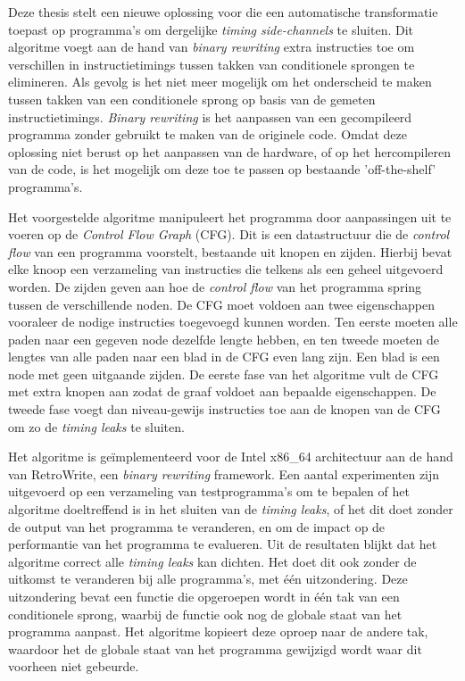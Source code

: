 \documentclass[master=cws,masteroption=ai, english]{kulemt}
\begin{document}
\begin{abstract*}
Deze thesis stelt een nieuwe oplossing voor die een automatische transformatie toepast op programma's om dergelijke \textit{timing side-channels} te sluiten. 
Dit algoritme voegt aan de hand van \textit{binary rewriting} extra instructies toe om verschillen in instructietimings tussen takken van conditionele sprongen te elimineren. 
Als gevolg is het niet meer mogelijk om het onderscheid te maken tussen takken van een conditionele sprong op basis van de gemeten instructietimings.
\textit{Binary rewriting} is het aanpassen van een gecompileerd programma zonder gebruikt te maken van de originele code. 
Omdat deze oplossing niet berust op het aanpassen van de hardware, of op het hercompileren van de code, is het mogelijk om deze toe te passen op bestaande 'off-the-shelf' programma's. 

Het voorgestelde algoritme manipuleert het programma door aanpassingen uit te voeren op de \textit{Control Flow Graph} (CFG). 
Dit is een datastructuur die de \textit{control flow} van een programma voorstelt, bestaande uit knopen en zijden. Hierbij bevat elke knoop een verzameling van instructies die telkens 
als een geheel uitgevoerd worden. De zijden geven aan hoe de \textit{control flow} van het programma spring tussen de verschillende noden. 
De CFG moet voldoen aan twee eigenschappen vooraleer de nodige instructies toegevoegd kunnen worden. 
Ten eerste moeten alle paden naar een gegeven node dezelfde lengte hebben, en ten tweede 
moeten de lengtes van alle paden naar een blad in de CFG even lang zijn. Een blad is een node met geen uitgaande zijden. 
De eerste fase van het algoritme vult de CFG met extra knopen aan zodat de graaf voldoet aan bepaalde eigenschappen. 
De tweede fase voegt dan niveau-gewijs instructies toe aan de knopen van de CFG om zo de \textit{timing leaks} te sluiten. 

Het algoritme is ge\"implementeerd voor de Intel x86\_64 architectuur aan de hand van RetroWrite, een \textit{binary rewriting} framework. 
Een aantal experimenten zijn uitgevoerd op een verzameling van testprogramma's om te bepalen of het algoritme doeltreffend is in het sluiten van de \textit{timing leaks}, of het dit doet 
zonder de output van het programma te veranderen, en om de impact op de performantie van het programma te evalueren. 
Uit de resultaten blijkt dat het algoritme correct alle \textit{timing leaks} kan dichten. Het doet dit ook zonder de uitkomst te veranderen bij alle programma's, met \'e\'en uitzondering. 
Deze uitzondering bevat een functie die opgeroepen wordt in \'e\'en tak van een conditionele sprong, waarbij de functie ook nog de globale staat van het programma aanpast. Het algoritme kopieert deze oproep naar de andere tak, waardoor
het de globale staat van het programma gewijzigd wordt waar dit voorheen niet gebeurde. 


\end{abstract*}
\end{document}

